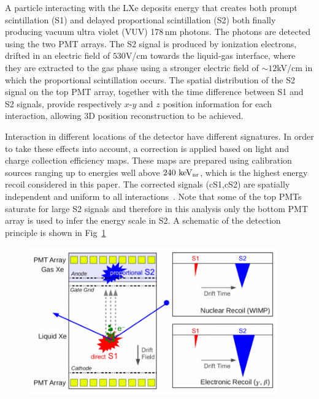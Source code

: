 A particle interacting with the LXe deposits energy that creates both
prompt scintillation (S1) and delayed proportional scintillation (S2) both finally producing vacuum ultra violet (VUV) 178\,nm photons. The photons are detected using the two PMT arrays. The S2 signal is produced by ionization electrons, drifted in an electric field of $530$V/cm towards the liquid-gas interface, where they are extracted to the gas phase using a stronger electric field of $\sim12$kV/cm in which the proportional scintillation occurs. 
The spatial distribution of the S2 signal on the top PMT array, together with the time difference between S1 and S2 signals, provide respectively $x$-$y$ and $z$ position information for each interaction, allowing 3D position reconstruction to be achieved.

Interaction in different locations of  the detector have different signatures. In order to take these effects into account, a correction is applied based on light and charge collection efficiency maps. These maps are prepared using calibration sources ranging up to energies well above $240~\mathrm{keV_\mathrm{nr}}$, which is the highest energy recoil considered in this paper. The corrected signals (cS1,cS2) are spatially independent and uniform to all interactions~\cite{xe100_instr2012}. Note that some of the top PMTs saturate for large S2 signals and therefore in this analysis only the bottom PMT array is used to infer the energy scale in S2. A schematic of the detection principle is shown in Fig~\ref{fig:xe100TPC}

\begin{figure}[]
	\centering
	\includegraphics[width=0.95\textwidth]{figs/xe100TPC.png}
	\label{fig:xe100TPC}
\end{figure}

